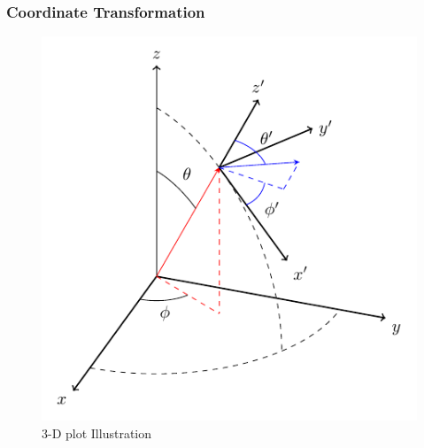 \documentclass[hyperref={pdfpagelabels=true}]{beamer}
\begin{document}
\begin{frame}
\frametitle{Coordinate Transformation}
\begin{figure}[t]
\centering
\includegraphics[scale=0.78]{spherical/b.pdf}
\caption{3-D plot Illustration}
\end{figure}
\end{frame}
\end{document}
